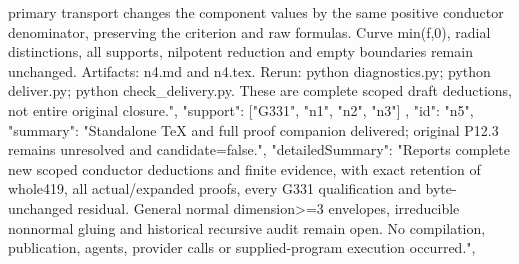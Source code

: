 \documentclass[11pt]{article}
\begin{document}
\begin{Full422Data}
{{primary transport changes the component values by the same positive conductor denominator, preserving the criterion and raw formulas. Curve min(f,0), radial distinctions, all supports, nilpotent reduction and empty boundaries remain unchanged. Artifacts: n4.md and n4.tex. Rerun: python diagnostics.py; python deliver.py; python check_delivery.py. These are complete scoped draft deductions, not entire original closure.",
      "support": ["G331", "n1", "n2", "n3"]
    },
    {
      "id": "n5",
      "summary": "Standalone TeX and full proof companion delivered; original P12.3 remains unresolved and candidate=false.",
      "detailedSummary": "Reports complete new scoped conductor deductions and finite evidence, with exact retention of whole419, all actual/expanded proofs, every G331 qualification and byte-unchanged residual. General normal dimension>=3 envelopes, irreducible nonnormal gluing and historical recursive audit remain open. No compilation, publication, agents, provider calls or supplied-program execution occurred.",
}}
\end{Full422Data}
\end{document}
